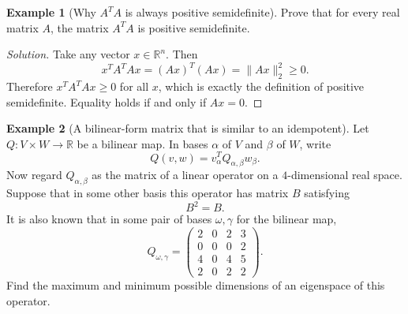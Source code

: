 \documentclass[11pt]{article}
\theoremstyle{definition}
\newtheorem{example}{Example}[section]
\newcommand{\R}{\mathbb{R}}
\begin{document}
\begin{example}[Why $A^TA$ is always positive semidefinite]
Prove that for every real matrix $A$, the matrix $A^TA$ is positive semidefinite.
\end{example}

\begin{proof}[Solution]
Take any vector $x\in\R^n$. Then
\[
x^T A^T A x = (Ax)^T(Ax)=\|Ax\|_2^2 \ge 0.
\]
Therefore $x^TA^TAx\ge 0$ for all $x$, which is exactly the definition of positive semidefinite. Equality holds if and only if $Ax=0$.
\end{proof}

\begin{example}[A bilinear-form matrix that is similar to an idempotent]
Let $Q:V\times W\to \R$ be a bilinear map. In bases $\alpha$ of $V$ and $\beta$ of $W$, write
\[
Q(v,w)=v_{\alpha}^T Q_{\alpha,\beta} w_{\beta}.
\]
Now regard $Q_{\alpha,\beta}$ as the matrix of a linear operator on a $4$-dimensional real space. Suppose that in some other basis this operator has matrix $B$ satisfying
\[
B^2=B.
\]
It is also known that in some pair of bases $\omega,\gamma$ for the bilinear map,
\[
Q_{\omega,\gamma}=
\begin{pmatrix}
2&0&2&3\\
0&0&0&2\\
4&0&4&5\\
2&0&2&2
\end{pmatrix}.
\]
Find the maximum and minimum possible dimensions of an eigenspace of this operator.
\end{example}
\end{document}
